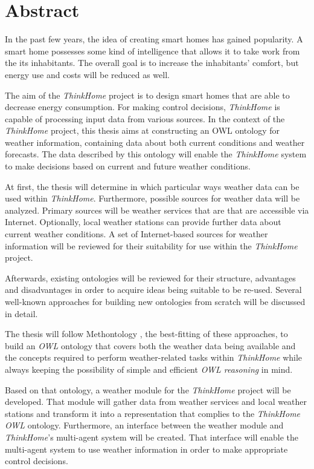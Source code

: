 \chapter*{Abstract}

In the past few years, the idea of creating smart homes has gained popularity.
A smart home possesses some kind of intelligence that allows it to take work from the its inhabitants.
The overall goal is to increase the inhabitants' comfort, but energy use and costs will be reduced as well.

The aim of the \textit{ThinkHome} project \cite{CR2011-TH_Journal} \cite{CR2010-DEST_ThinkHome} is to design smart homes that are able to decrease energy consumption.
For making control decisions, \textit{ThinkHome} is capable of processing input data from various sources.
In the context of the \textit{ThinkHome} project, this thesis aims at constructing an OWL ontology for weather information, containing data about both current conditions and weather forecasts.
The data described by this ontology will enable the \textit{ThinkHome} system to make decisions based on current and future weather conditions.

At first, the thesis will determine in which particular ways weather data can be used within \textit{ThinkHome}. Furthermore, possible sources for weather data will be analyzed. Primary sources will be weather services that are that are accessible via Internet. Optionally, local weather stations can provide further data about current weather conditions. A set of Internet-based sources for weather information will be reviewed for their suitability for use within the \textit{ThinkHome} project.

Afterwards, existing ontologies will be reviewed for their structure, advantages and disadvantages in order to acquire ideas being suitable to be re-used. Several well-known approaches for building new ontologies from scratch will be discussed in detail.

The thesis will follow Methontology \cite{Methontology}, the best-fitting of these approaches, to build an \textit{OWL} ontology that covers both the weather data being available and the concepts required to perform weather-related tasks within \textit{ThinkHome} while always keeping the possibility of simple and efficient \textit{OWL reasoning} in mind.

Based on that ontology, a weather module for the \textit{ThinkHome} project will be developed. That module will gather data from weather services and local weather stations and transform it into a representation that complies to the \textit{ThinkHome} \textit{OWL} ontology. Furthermore, an interface between the weather module and \textit{ThinkHome}'s multi-agent system will be created. That interface will enable the multi-agent system to use weather information in order to make appropriate control decisions.
